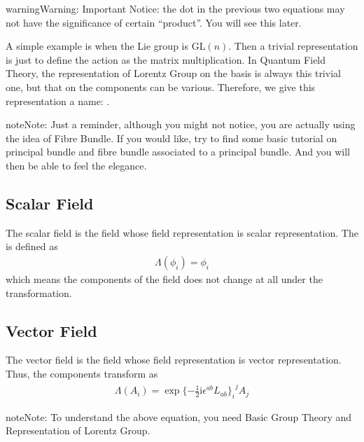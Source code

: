 \documentclass[letterpaper,10pt,english]{sphinxmanual}
\begin{document}
\begin{sphinxadmonition}{warning}{Warning:}
Important Notice: the dot in the previous two equations may not have the significance of certain ``product''. You will see this later.
\end{sphinxadmonition}

A simple example is when the Lie group is \(\mathrm{GL}(n)\). Then a trivial representation is just to define the action as the matrix multiplication. In Quantum Field Theory, the representation of Lorentz Group on the basis is always this trivial one, but that on the components can be various. Therefore, we give this representation a name: .

\begin{sphinxadmonition}{note}{Note:}
Just a reminder, although you might not notice, you are actually using the idea of Fibre Bundle. If you would like, try to find some basic tutorial on principal bundle and fibre bundle associated to a principal bundle. And you will then be able to feel the elegance.
\end{sphinxadmonition}


\subsection{Scalar Field}
\label{\detokenize{field:scalar-field}}
The scalar field is the field whose field representation is scalar representation. The  is defined as
\begin{equation*}
\begin{split}\varLambda(\phi_i) = \phi_i\end{split}
\end{equation*}
which means the components of the field does not change at all under the transformation.


\subsection{Vector Field}
\label{\detokenize{field:vector-field}}
The vector field is the field whose field representation is vector representation. Thus, the components transform as
\begin{equation*}
\begin{split}\varLambda(A_i) = \exp\{-\frac{1}{2}\mathrm{i}\epsilon^{ab}L_{ab}{\}_i}^jA_j\end{split}
\end{equation*}
\begin{sphinxadmonition}{note}{Note:}
To understand the above equation, you need Basic Group Theory and Representation of Lorentz Group.
\end{sphinxadmonition}
\end{document}

